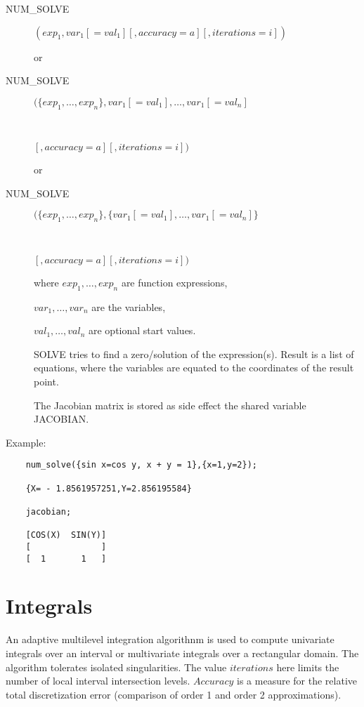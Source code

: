 \begin{description}
\item[NUM\_SOLVE]  $(exp_1, var_1[=val_1][,accuracy=a][,iterations=i])$
 
or 

\item[NUM\_SOLVE]  $(\{exp_1,\ldots,exp_n\},
   var_1[=val_1],\ldots,var_1[=val_n]$
\item[\ \ \ \ \ \ \ \ ]$[,accuracy=a][,iterations=i])$
 
or 

\item[NUM\_SOLVE]  $(\{exp_1,\ldots,exp_n\},
   \{var_1[=val_1],\ldots,var_1[=val_n]\}$
\item[\ \ \ \ \ \ \ \ ]$[,accuracy=a][,iterations=i])$

where $exp_1, \ldots,exp_n$ are function expressions,

      $var_1, \ldots, var_n$ are the variables,

      $val_1, \ldots, val_n$ are optional start values.
 
SOLVE tries to find a zero/solution of the expression(s).
Result is a list of equations, where the variables are
equated to the coordinates of the result point.
 
The Jacobian matrix is stored as side effect the shared
variable JACOBIAN.

\end{description}
 
Example:
 
\begin{verbatim}
    num_solve({sin x=cos y, x + y = 1},{x=1,y=2});

    {X= - 1.8561957251,Y=2.856195584}
 
    jacobian;
 
    [COS(X)  SIN(Y)]
    [              ]
    [  1       1   ]
\end{verbatim}

\section{Integrals}
 
An adaptive multilevel integration algorithnm is used
to compute univariate integrals over an interval or
multivariate integrals over a rectangular domain.
The algorithm tolerates isolated singularities. 
The value $iterations$ here limits the number of
local interval intersection levels. 
$Accuracy$ is a measure for the relative total discretization
error (comparison of order 1 and order 2 approximations).

